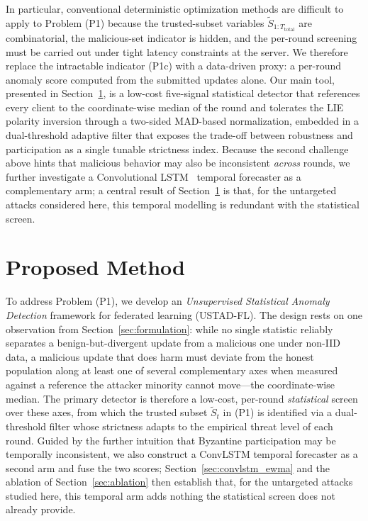 \documentclass[journal]{IEEEtran}
\begin{document}
In particular, conventional deterministic optimization methods are difficult to apply to Problem (P1) because the trusted-subset variables $\widetilde{S}_{1:T_{\text{total}}}$ are combinatorial, the malicious-set indicator is hidden, and the per-round screening must be carried out under tight latency constraints at the server. We therefore replace the intractable indicator (P1c) with a data-driven proxy: a per-round anomaly score computed from the submitted updates alone. Our main tool, presented in Section~\ref{sec:method}, is a low-cost five-signal statistical detector that references every client to the coordinate-wise median of the round and tolerates the LIE polarity inversion through a two-sided MAD-based normalization, embedded in a dual-threshold adaptive filter that exposes the trade-off between robustness and participation as a single tunable strictness index. Because the second challenge above hints that malicious behavior may also be inconsistent \emph{across} rounds, we further investigate a Convolutional LSTM~\cite{shi2015convolutional} temporal forecaster as a complementary arm; a central result of Section~\ref{sec:method} is that, for the untargeted attacks considered here, this temporal modelling is redundant with the statistical screen.

\section{Proposed Method}
\label{sec:method}

To address Problem (P1), we develop an \emph{Unsupervised Statistical Anomaly Detection} framework for federated learning (USTAD-FL). The design rests on one observation from Section~\ref{sec:formulation}: while no single statistic reliably separates a benign-but-divergent update from a malicious one under non-IID data, a malicious update that does harm must deviate from the honest population along at least one of several complementary axes when measured against a reference the attacker minority cannot move---the coordinate-wise median. The primary detector is therefore a low-cost, per-round \emph{statistical} screen over these axes, from which the trusted subset $\widetilde{S}_t$ in (P1) is identified via a dual-threshold filter whose strictness adapts to the empirical threat level of each round. Guided by the further intuition that Byzantine participation may be temporally inconsistent, we also construct a ConvLSTM temporal forecaster as a second arm and fuse the two scores; Section~\ref{sec:convlstm_ewma} and the ablation of Section~\ref{sec:ablation} then establish that, for the untargeted attacks studied here, this temporal arm adds nothing the statistical screen does not already provide.
\end{document}
